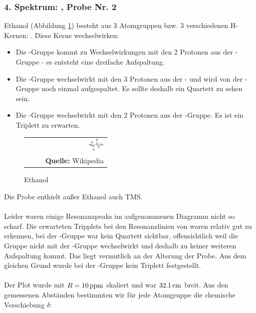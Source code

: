 \documentclass[a4paper,titlepage]{scrartcl}
\numberwithin{equation}{section}
\begin{document}
\subsubsection{4. Spektrum: , Probe Nr. 2}
Ethanol (Abbildung \ref{fig:ethanol}) besteht aus 3 Atomgruppen bzw. 3 verschiedenen H-Kernen: . Diese Kerne wechselwirken:
\begin{itemize}
\item Die -Gruppe kommt zu Wechselwirkungen mit den 2 Protonen aus der -Gruppe - es entsteht eine dreifache Aufspaltung.
\item Die -Gruppe wechselwirkt mit den 3 Protonen aus der - und wird von der -Gruppe noch einmal aufgespaltet. Es sollte deshalb ein Quartett zu sehen sein.
\item Die -Gruppe wechselwirkt mit den 2 Protonen aus der -Gruppe. Es ist ein Triplett zu erwarten.
\end{itemize}
\begin{figure}[H]
	\centering
	\begin{tabular}{@{}r@{}}
		\includegraphics[width=0.2\textwidth]{ethanol.png}\\
	\footnotesize\sffamily\textbf{Quelle:} Wikipedia \cite{wiki:ethanol}
	\end{tabular}
	\caption{Ethanol }
    \label{fig:ethanol}
\end{figure}
Die Probe enthielt außer Ethanol auch TMS. \\ \\
Leider waren einige Resonanzpeaks im aufgenommenen Diagramm nicht so scharf. Die erwarteten Tripplets bei den Resonanzlinien von  waren relativ gut zu erkennen, bei der -Gruppe war kein Quartett sichtbar, offensichtlich weil die Gruppe nicht mit der -Gruppe wechselwirkt und deshalb zu keiner weiteren Aufspaltung kommt. Das liegt vermutlich an der Alterung der Probe. Aus dem gleichen Grund wurde bei der -Gruppe kein Triplett festgestellt.\\ \\
Der Plot wurde mit $R=\unit[10]{ppm}$ skaliert und war $\unit[32.1]{cm}$ breit. Aus den gemessenen Abständen bestimmten wir für jede Atomgruppe die chemische Verschiebung $\delta$:
\end{document}
